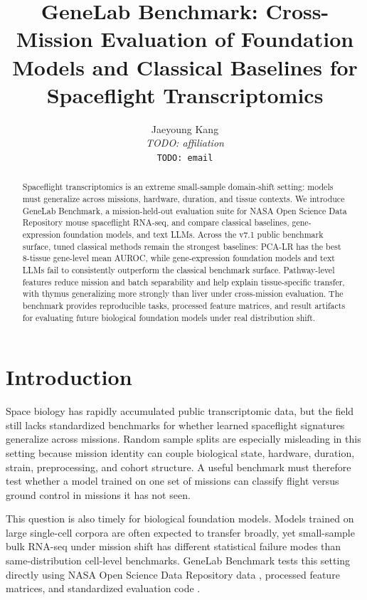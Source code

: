 \documentclass[11pt]{article}
\title{GeneLab Benchmark: Cross-Mission Evaluation of Foundation Models and Classical Baselines for Spaceflight Transcriptomics}
\author{
  Jaeyoung Kang\\
  \textit{TODO: affiliation}\\
  \texttt{TODO: email}
}
\date{}
\begin{document}
\maketitle

\begin{abstract}
Spaceflight transcriptomics is an extreme small-sample domain-shift setting:
models must generalize across missions, hardware, duration, and tissue
contexts. We introduce GeneLab Benchmark, a mission-held-out evaluation suite
for NASA Open Science Data Repository mouse spaceflight RNA-seq, and compare
classical baselines, gene-expression foundation models, and text LLMs. Across
the v7.1 public benchmark surface, tuned classical methods remain the strongest
baselines: PCA-LR has the best 8-tissue gene-level mean AUROC, while
gene-expression foundation models and text LLMs fail to consistently outperform
the classical benchmark surface. Pathway-level features reduce mission and
batch separability and help explain tissue-specific transfer, with thymus
generalizing more strongly than liver under cross-mission evaluation. The
benchmark provides reproducible tasks, processed feature matrices, and result
artifacts for evaluating future biological foundation models under real
distribution shift.
\end{abstract}

\section{Introduction}

Space biology has rapidly accumulated public transcriptomic data, but the
field still lacks standardized benchmarks for whether learned spaceflight
signatures generalize across missions. Random sample splits are especially
misleading in this setting because mission identity can couple biological
state, hardware, duration, strain, preprocessing, and cohort structure. A useful
benchmark must therefore test whether a model trained on one set of missions
can classify flight versus ground control in missions it has not seen.

This question is also timely for biological foundation models. Models trained
on large single-cell corpora are often expected to transfer broadly, yet
small-sample bulk RNA-seq under mission shift has different statistical
failure modes than same-distribution cell-level benchmarks. GeneLab Benchmark
tests this setting directly using NASA Open Science Data Repository data
\citep{nasa_osdr}, processed feature matrices, and standardized evaluation
code \citep{genelab_benchmark_repo,genelab_benchmark_hf}.
\end{document}
